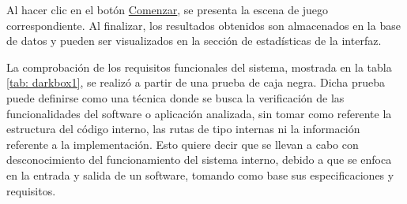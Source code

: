 \vspace{5pt}
Al hacer clic en el botón \underline{Comenzar}, se presenta la escena de juego correspondiente. Al finalizar, los resultados obtenidos son almacenados en la base de datos y pueden ser visualizados en la sección de estadísticas de la interfaz. 

La comprobación de los requisitos funcionales del sistema, mostrada en la tabla \ref{tab: darkbox1}, se realizó a partir de una prueba de caja negra. Dicha prueba puede definirse como una técnica donde se busca la verificación de las funcionalidades del software o aplicación analizada, sin tomar como referente la estructura del código interno, las rutas de tipo internas ni la información referente a la implementación. Esto quiere decir que se llevan a cabo con desconocimiento del funcionamiento del sistema interno, debido a que se enfoca en la entrada y salida de un software, tomando como base sus especificaciones y requisitos.    

